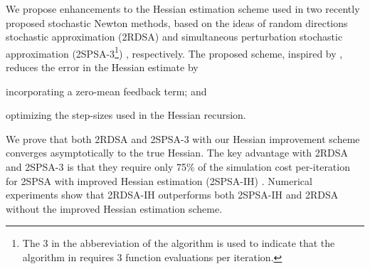 \documentclass[12pt]{article}
\begin{document}
We propose enhancements to the Hessian estimation scheme used in two recently proposed stochastic Newton methods, based on the ideas of random directions stochastic approximation (2RDSA) \cite{prashanth2015rdsa} and simultaneous perturbation stochastic approximation (2SPSA-3\footnote{The 3 in the abbereviation of the algorithm is used to indicate that the algorithm in \cite{bhatnagar2015simultaneous} requires 3 function evaluations per iteration.}) \cite{bhatnagar2015simultaneous}, respectively. The proposed scheme, inspired by \cite{spall-jacobian}, reduces the error in the Hessian estimate by 
\begin{inparaenum}[\bfseries (i)]
	\item incorporating a zero-mean feedback term; and
	\item optimizing the step-sizes used in the Hessian recursion.
\end{inparaenum}
We prove that both 2RDSA and 2SPSA-3 with our Hessian improvement scheme converges asymptotically to the true Hessian.
The key advantage with 2RDSA and 2SPSA-3  is that they require only 75\% of the simulation cost per-iteration for 2SPSA with improved Hessian estimation (2SPSA-IH) \cite{spall-jacobian}.
Numerical experiments show that 2RDSA-IH outperforms both 2SPSA-IH and 2RDSA without the improved Hessian estimation scheme.




\end{document}
